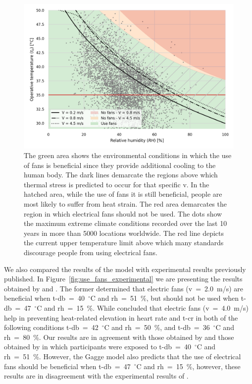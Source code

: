 \begin{figure}[thb!]
    \centering
    \includegraphics[width=\textwidth]{figures/use_fans}
    \caption{The green area shows the environmental conditions in which the use of fans is beneficial since they provide additional cooling to the human body.
    The dark lines demarcate the regions above which thermal stress is predicted to occur for that specific \ac{v}.
    In the hatched area, while the use of fans it is still beneficial, people are most likely to suffer from heat strain.
    The red area demarcates the region in which electrical fans should not be used.
    The dots show the maximum extreme climate conditions recorded over the last 10 years in more than 5000 locations worldwide.
    The red line depicts the current upper temperature limit above which many standards discourage people from using electrical fans.}
    \label{fig:energy_storage_delta}
\end{figure}


We also compared the results of the  model with experimental results previously published.
In Figure~\ref{fig:use_fans_experimental} we are presenting the results obtained by  and .
The former determined that electric fans (\ac{v}~=~2.0~m/s) are beneficial when \ac{t-db}~=~40~$^{\circ}$C and \ac{rh}~=~51~\%, but should not be used when \ac{t-db}~=~47~$^{\circ}$C and \ac{rh}~=~15~\%.
While  concluded that electric fans (\ac{v}~=~4.0~m/s) help in preventing heat-related elevation in heart rate and \ac{t-cr} in both of the following conditions \ac{t-db}~=~42~$^{\circ}$C and \ac{rh}~=~50~\%, and \ac{t-db}~=~36~$^{\circ}$C and \ac{rh}~=~80~\%.
Our results are in agreement with those obtained by  and those obtained by  in which participants were exposed to \ac{t-db}~=~40~$^{\circ}$C and \ac{rh}~=~51~\%.
However, the Gagge model also predicts that the use of electrical fans should be beneficial when \ac{t-db}~=~47~$^{\circ}$C and \ac{rh}~=~15~\%, however, these results are in disagreement with the experimental results of .

